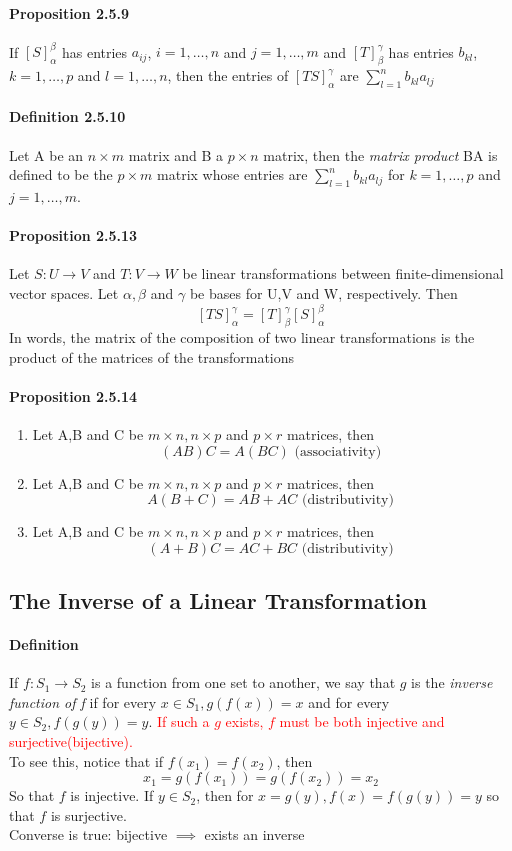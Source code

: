 \documentclass[11pt]{article}
\newcommand{\ti}[1]{\textit{#1}}
\newcommand{\trans}[3]{{#1}: {#2} \rightarrow {#3}}
\begin{document}
{\paragraph{Proposition 2.5.9} If $[S]_\alpha^\beta$ has entries $a_{ij}$, $i = 1,\hdots,n$ and $ j = 1, \hdots, m$ and $[T]_\beta^\gamma$ has entries $b_{kl}$, $k = 1, \hdots, p$ and $l = 1, \hdots, n$, then the entries of $[TS]_\alpha^\gamma$  are $\sum_{l=1}^n b_{kl}a_{lj}$
\paragraph{Definition 2.5.10} Let A be an $n\times m$ matrix and B a $p\times n$ matrix, then the \ti{matrix product} BA is defined to be the $p \times m$ matrix whose entries are $\sum_{l = 1}^n b_{kl}a_{lj}$ for $k = 1, \hdots, p$ and $j = 1, \hdots, m$.
\paragraph{Proposition 2.5.13} Let $\trans{S}{U}{V}$ and $\trans{T}{V}{W}$ be linear transformations between finite-dimensional vector spaces. Let $\alpha, \beta$ and $\gamma$ be bases for U,V and W, respectively. Then $$[TS]_\alpha^\gamma = [T]_\beta^\gamma[S]_\alpha^\beta$$
In words, the matrix of the composition of two linear transformations is the product of the matrices of the transformations
\paragraph{Proposition 2.5.14}
\begin{enumerate}
	\item Let A,B and C be $m\times n, n\times p$ and $p \times r$ matrices, then
	$$(AB)C = A(BC) \mbox{ (associativity) }$$
	\item Let A,B and C be $m\times n, n\times p$ and $p \times r$ matrices, then
	$$A(B + C) = AB + AC \mbox{ (distributivity) }$$
	\item Let A,B and C be $m\times n, n\times p$ and $p \times r$ matrices, then
	$$(A+B)C = AC + BC \mbox{ (distributivity) }$$
\end{enumerate}
\subsection{The Inverse of a Linear Transformation}
\paragraph{Definition} If $f: S_1 \rightarrow S_2$ is a function from one set to another, we say that $g$ is the \ti{inverse function of f} if for every $x \in S_1, g(f(x)) = x$ and for every $y \in S_2, f(g(y)) = y$. \textcolor{red}{If such a $g$ exists, $f$ must be both injective and surjective(bijective).} \\
To see this, notice that if $f(x_1) = f(x_2)$, then $$x_1 = g(f(x_1)) = g(f(x_2)) = x_2$$ So that $f$ is injective. If $y \in S_2$, then for $x = g(y), f(x) = f(g(y)) = y$ so that $f$ is surjective.\\
Converse is true: bijective $\implies$ exists an inverse
}
\end{document}
